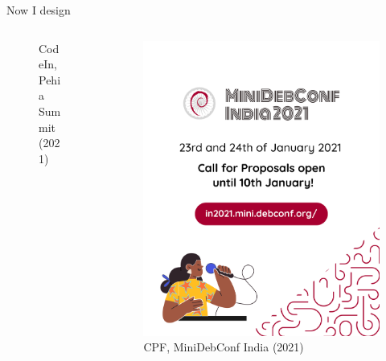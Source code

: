 \documentclass[presentation]{beamer}
\begin{document}
\begin{frame}[label={sec:org54778ac}]{Now I design}
\begin{columns}
\begin{column}{0.25\columnwidth}
\begin{figure}[htbp]
\caption{CodeIn, Pehia Summit (2021)}
\end{figure}
\end{column}
\begin{column}{0.25\columnwidth}
\begin{figure}[htbp]
\centering
\includegraphics[width=.9\linewidth]{./images/cpfdraft.png}
\caption{CPF, MiniDebConf India (2021)}
\end{figure}
\end{column}
\end{columns}
\end{frame}
\end{document}
